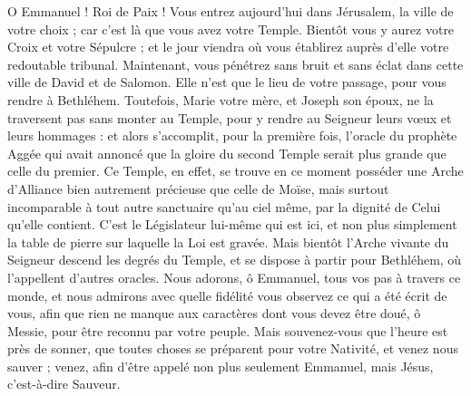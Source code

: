 \documentclass[%
fontsize=10%
,a6paper%
,DIV=15%
]{scrartcl}
\begin{document}
O Emmanuel ! Roi de Paix ! Vous entrez aujourd’hui dans Jérusalem, la ville de votre choix ; car c’est là que vous avez votre Temple. Bientôt vous y aurez votre Croix et votre Sépulcre ; et le jour viendra où vous établirez auprès d’elle votre redoutable tribunal. Maintenant, vous pénétrez sans bruit et sans éclat dans cette ville de David et de Salomon. Elle n’est que le lieu de votre passage, pour vous rendre à Bethléhem. Toutefois, Marie votre mère, et Joseph son époux, ne la traversent pas sans monter au Temple, pour y rendre au Seigneur leurs vœux et leurs hommages : et alors s’accomplit, pour la première fois, l’oracle du prophète Aggée qui avait annoncé que la gloire du second Temple serait plus grande que celle du premier. Ce Temple, en effet, se trouve en ce moment posséder une Arche d’Alliance bien autrement précieuse que celle de Moïse, mais surtout incomparable à tout autre sanctuaire qu’au ciel même, par la dignité de Celui qu’elle contient. C’est le Législateur lui-même qui est ici, et non plus simplement la table de pierre sur laquelle la Loi est gravée. Mais bientôt l’Arche vivante du Seigneur descend les degrés du Temple, et se dispose à partir pour Bethléhem, où l’appellent d’autres oracles. Nous adorons, ô Emmanuel, tous vos pas à travers ce monde, et nous admirons avec quelle fidélité vous observez ce qui a été écrit de vous, afin que rien ne manque aux caractères dont vous devez être doué, ô Messie, pour être reconnu par votre peuple. Mais souvenez-vous que l’heure est près de sonner, que toutes choses se préparent pour votre Nativité, et venez nous sauver ; venez, afin d’être appelé non plus seulement Emmanuel, mais Jésus, c’est-à-dire Sauveur.


\newpage
{}
\label{section:magnificat}
\gloria[tonus=per]
\medskip
{}
\medskip
{}
\end{document}
